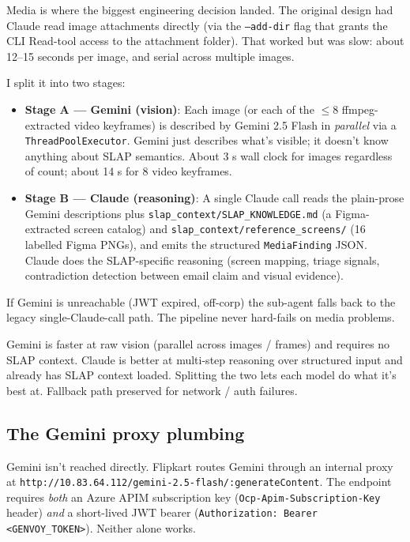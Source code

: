 \documentclass[11pt,a4paper]{article}
\begin{document}
Media is where the biggest engineering decision landed. The original design
had Claude read image attachments directly (via the \texttt{--add-dir} flag
that grants the CLI Read-tool access to the attachment folder). That worked
but was slow: about 12--15 seconds per image, and serial across multiple
images.

I split it into two stages:

\begin{itemize}[leftmargin=1.4em,nosep]
\item \textbf{Stage A --- Gemini (vision)}: Each image (or each of the
      $\leq 8$ ffmpeg-extracted video keyframes) is described by Gemini
      2.5 Flash in \emph{parallel} via a \texttt{ThreadPoolExecutor}.
      Gemini just describes what's visible; it doesn't know anything about
      SLAP semantics. About 3 s wall clock for images regardless of count;
      about 14 s for 8 video keyframes.
\item \textbf{Stage B --- Claude (reasoning)}: A single Claude call reads
      the plain-prose Gemini descriptions plus
      \texttt{slap\_context/SLAP\_KNOWLEDGE.md} (a Figma-extracted screen
      catalog) and \texttt{slap\_context/reference\_screens/} (16 labelled
      Figma PNGs), and emits the structured \texttt{MediaFinding} JSON.
      Claude does the SLAP-specific reasoning (screen mapping, triage
      signals, contradiction detection between email claim and visual
      evidence).
\end{itemize}

If Gemini is unreachable (JWT expired, off-corp) the sub-agent falls back
to the legacy single-Claude-call path. The pipeline never hard-fails on
media problems.

\begin{decisionbox}
Gemini is faster at raw vision (parallel across images / frames) and
requires no SLAP context. Claude is better at multi-step reasoning over
structured input and already has SLAP context loaded. Splitting the two
lets each model do what it's best at. Fallback path preserved for
network / auth failures.
\end{decisionbox}

\subsection{The Gemini proxy plumbing}

Gemini isn't reached directly. Flipkart routes Gemini through an internal
proxy at \texttt{http://10.83.64.112/gemini-2.5-flash/:generateContent}.
The endpoint requires \emph{both} an Azure APIM subscription key
(\texttt{Ocp-Apim-Subscription-Key} header) \emph{and} a short-lived JWT
bearer (\texttt{Authorization: Bearer <GENVOY\_TOKEN>}). Neither alone
works.
\end{document}
